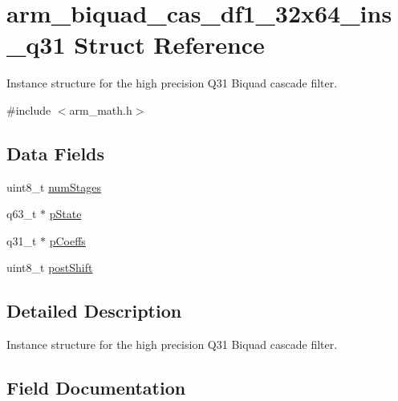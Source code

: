 \hypertarget{structarm__biquad__cas__df1__32x64__ins__q31}{}\section{arm\+\_\+biquad\+\_\+cas\+\_\+df1\+\_\+32x64\+\_\+ins\+\_\+q31 Struct Reference}
\label{structarm__biquad__cas__df1__32x64__ins__q31}


Instance structure for the high precision Q31 Biquad cascade filter.  




{\ttfamily \#include $<$arm\+\_\+math.\+h$>$}

\subsection*{Data Fields}
\begin{DoxyCompactItemize}
\item 
uint8\+\_\+t \hyperlink{structarm__biquad__cas__df1__32x64__ins__q31_a3615af038f56917909e0370c11bc2ec7}{num\+Stages}
\item 
q63\+\_\+t $\ast$ \hyperlink{structarm__biquad__cas__df1__32x64__ins__q31_adefeb77301cc04e4d7d22f323029d588}{p\+State}
\item 
q31\+\_\+t $\ast$ \hyperlink{structarm__biquad__cas__df1__32x64__ins__q31_a68888e36167d81cb7836db10367a1682}{p\+Coeffs}
\item 
uint8\+\_\+t \hyperlink{structarm__biquad__cas__df1__32x64__ins__q31_a74050e9f36542bd56f4052381a82ae8f}{post\+Shift}
\end{DoxyCompactItemize}


\subsection{Detailed Description}
Instance structure for the high precision Q31 Biquad cascade filter. 

\subsection{Field Documentation}
\mbox{\label{structarm__biquad__cas__df1__32x64__ins__q31_a3615af038f56917909e0370c11bc2ec7}} 
